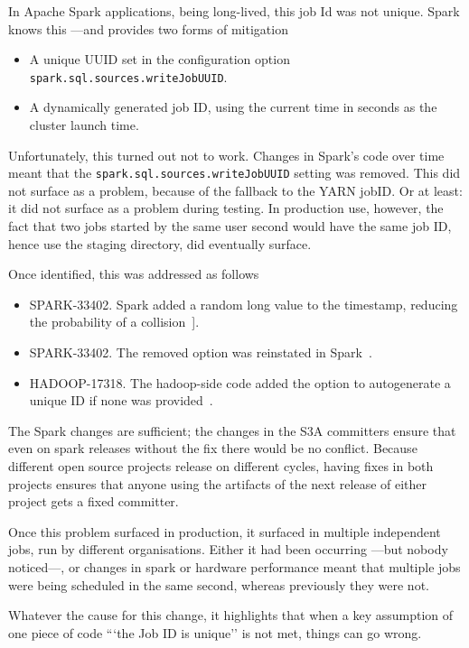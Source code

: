\documentclass[conference]{IEEEtran}
\begin{document}
In Apache Spark applications, being long-lived, this job Id was not unique.
Spark knows this ---and provides two forms of mitigation
\begin{itemize}
    \item A unique UUID set in the configuration option \texttt{spark.sql.sources.writeJobUUID}.
    \item A dynamically generated job ID, using the current time in seconds as the cluster launch time.
\end{itemize}

Unfortunately, this turned out not to work.
Changes in Spark's code over time meant that the
\texttt{spark.sql.sources.writeJobUUID} setting was removed.
This did not surface as a problem, because of the fallback to the YARN jobID.
Or at least: it did not surface as a problem during testing.
In production use, however, the fact that two jobs started by the same user
second would have the same job ID, hence use the staging directory,
did eventually surface.

Once identified, this was addressed as follows
\begin{itemize}
    \item SPARK-33402. Spark added a random long value to the timestamp, reducing the probability of a collision\ \cite{SPARK-33402}].
    \item SPARK-33402. The removed option was reinstated in Spark\ \cite{SPARK-33230}.
    \item HADOOP-17318. The hadoop-side code added the option to autogenerate a unique ID if none was provided\ \cite{HADOOP-17318}.
\end{itemize}

The Spark changes are sufficient;
the changes in the S3A committers ensure that even on spark releases without the fix there would be no conflict.
Because different open source projects release on different cycles, having fixes
in both projects ensures that anyone using the artifacts of the next release of either
project gets a fixed committer.

Once this problem surfaced in production, it surfaced in multiple independent
jobs, run by different organisations.
Either it had been occurring ---but nobody noticed---, or changes in spark or hardware performance
meant that multiple jobs were being scheduled in the same second, whereas previously they were not.

Whatever the cause for this change, it highlights that when a key assumption of one piece of code
```the Job ID is unique'' is not met, things can go wrong.
\end{document}
